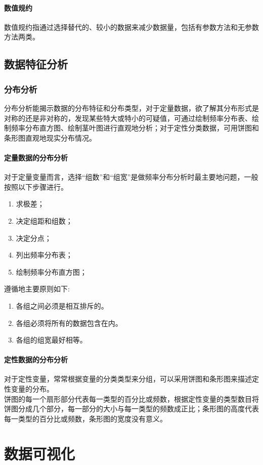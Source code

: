 \documentclass[openany]{progbookcn}
\begin{document}
\subsection{数值规约}
\indent 数值规约指通过选择替代的、较小的数据来减少数据量，包括有参数方法和无参数方法两类。
\chapter{数据特征分析}
\section{分布分析}
\indent 分布分析能揭示数据的分布特征和分布类型，对于定量数据，欲了解其分布形式是对称的还是非对称的，发现某些特大或特小的可疑值，可通过绘制频率分布表、绘制频率分布直方图、绘制茎叶图进行直观地分析；对于定性分类数据，可用饼图和条形图直观地现实分布情况。

\subsection{定量数据的分布分析}
\indent 对于定量变量而言，选择“组数”和“组宽”是做频率分布分析时最主要地问题，一般按照以下步骤进行。
\begin{enumerate}
    \item 求极差；
    \item 决定组距和组数；
    \item 决定分点；
    \item 列出频率分布表；
    \item 绘制频率分布直方图；
\end{enumerate}
\indent 遵循地主要原则如下:
\begin{enumerate}
    \item 各组之间必须是相互排斥的。
    \item 各组必须将所有的数据包含在内。
    \item 各组的组宽最好相等。
\end{enumerate}
\subsection{定性数据的分布分析}
\indent 对于定性变量，常常根据变量的分类类型来分组，可以采用饼图和条形图来描述定性变量的分布。\\
\indent 饼图的每一个扇形部分代表每一类型的百分比或频数，根据定性变量的类型数目将饼图分成几个部分，每一部分的大小与每一类型的频数成正比；条形图的高度代表每一类型的百分比或频数，条形图的宽度没有意义。


\part{数据可视化}
\end{document}
